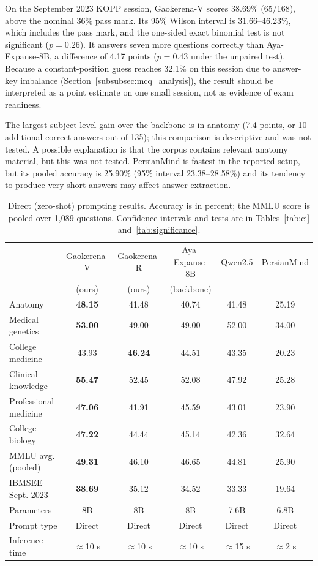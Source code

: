 \documentclass[manuscript,screen,review]{acmart}
\begin{document}
On the September 2023 KOPP session, Gaokerena-V scores 38.69\% (65/168), above the nominal 36\% pass mark. Its 95\% Wilson interval is 31.66--46.23\%, which includes the pass mark, and the one-sided exact binomial test is not significant ($p=0.26$). It answers seven more questions correctly than Aya-Expanse-8B, a difference of 4.17 points ($p=0.43$ under the unpaired test). Because a constant-position guess reaches 32.1\% on this session due to answer-key imbalance (Section~\ref{subsubsec:mcq_analysis}), the result should be interpreted as a point estimate on one small session, not as evidence of exam readiness.

The largest subject-level gain over the backbone is in anatomy (7.4 points, or 10 additional correct answers out of 135); this comparison is descriptive and was not tested. A possible explanation is that the corpus contains relevant anatomy material, but this was not tested. PersianMind is fastest in the reported setup, but its pooled accuracy is 25.90\% (95\% interval 23.38--28.58\%) and its tendency to produce very short answers may affect answer extraction.

\begin{table}[ht]
\caption{Direct (zero-shot) prompting results. Accuracy is in percent; the MMLU score is pooled over 1,089 questions. Confidence intervals and tests are in Tables~\ref{tab:ci} and~\ref{tab:significance}.}\label{tab:model_results_vs_general_purpose_languages}
\scriptsize
\setlength{\tabcolsep}{3pt}
\begin{tabular}{@{}lccccc@{}}
\toprule
 & Gaokerena-V & Gaokerena-R & Aya-Expanse-8B & Qwen2.5 & PersianMind \\
 & (ours) & (ours) & (backbone) & & \\
\midrule
Anatomy & \textbf{48.15} & 41.48 & 40.74 & 41.48 & 25.19 \\
Medical genetics & \textbf{53.00} & 49.00 & 49.00 & 52.00 & 34.00 \\
College medicine & 43.93 & \textbf{46.24} & 44.51 & 43.35 & 20.23 \\
Clinical knowledge & \textbf{55.47} & 52.45 & 52.08 & 47.92 & 25.28 \\
Professional medicine & \textbf{47.06} & 41.91 & 45.59 & 43.01 & 23.90 \\
College biology & \textbf{47.22} & 44.44 & 45.14 & 42.36 & 32.64 \\
MMLU avg. (pooled) & \textbf{49.31} & 46.10 & 46.65 & 44.81 & 25.90 \\
IBMSEE Sept. 2023 & \textbf{38.69} & 35.12 & 34.52 & 33.33 & 19.64 \\
\midrule
Parameters & 8B & 8B & 8B & 7.6B & 6.8B \\
Prompt type & Direct & Direct & Direct & Direct & Direct \\
Inference time & $\approx$10 s & $\approx$10 s & $\approx$10 s & $\approx$15 s & $\approx$2 s \\
\bottomrule
\end{tabular}
\end{table}
\end{document}
